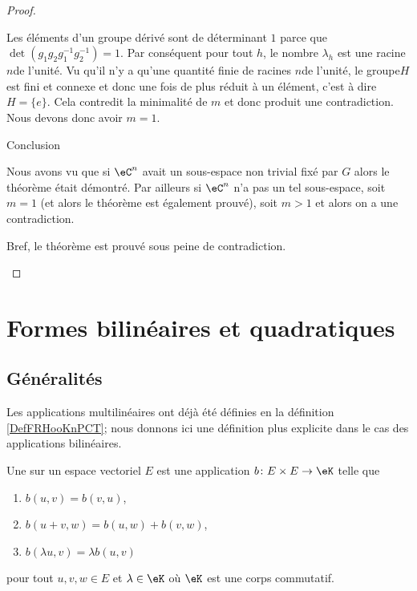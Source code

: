 \begin{proof}
\begin{subproof}
        Les éléments d'un groupe dérivé sont de déterminant \( 1\) parce que \( \det(g_1g_2g_1^{-1}g_2^{-1})=1\). Par conséquent pour tout \( h\), le nombre \( \lambda_h\) est une racine \( n\)\ieme de l'unité. Vu qu'il n'y a qu'une quantité finie de racines \( n\)\ieme de l'unité, le groupe\( H\) est fini et connexe et donc une fois de plus réduit à un élément, c'est à dire \( H=\{ e \}\). Cela contredit la minimalité de \( m\) et donc produit une contradiction. Nous devons donc avoir \( m=1\).

    \item[Conclusion]

        Nous avons vu que si \( \eC^n\) avait un sous-espace non trivial fixé par \( G\) alors le théorème était démontré. Par ailleurs si \( \eC^n\) n'a pas un tel sous-espace, soit \( m=1\) (et alors le théorème est également prouvé), soit \( m>1\) et alors on a une contradiction.

        Bref, le théorème est prouvé sous peine de contradiction.

    \end{subproof}

\end{proof}

\section{Formes bilinéaires et quadratiques}
\label{SecTQkRXIu}

\subsection{Généralités}

Les applications multilinéaires ont déjà été définies en la définition \ref{DefFRHooKnPCT}; nous donnons ici une définition plus explicite dans le cas des applications bilinéaires.
\begin{definition}
    Une  sur un espace vectoriel \( E\) est une application \( b\colon E\times E\to \eK\) telle que
    \begin{enumerate}
        \item
            \( b(u,v)=b(v,u)\),
        \item
            \( b(u+v,w)=b(u,w)+b(v,w)\),
        \item
            \( b(\lambda u,v)=\lambda b(u,v)\)
    \end{enumerate}
    pour tout \( u,v,w\in E\) et \( \lambda\in \eK\) où \( \eK\) est une corps commutatif.
\end{definition}

